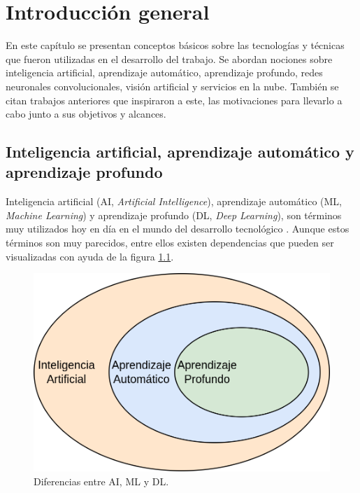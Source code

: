 
\chapter{Introducción general} %
\label{Chapter1} %
\label{IntroGeneral}


\newcommand{\keyword}[1]{\textbf{#1}}
\newcommand{\tabhead}[1]{\textbf{#1}}
\newcommand{\code}[1]{\texttt{#1}}
\newcommand{\file}[1]{\texttt{\bfseries#1}}
\newcommand{\option}[1]{\texttt{\itshape#1}}
\newcommand{\grados}{$^{\circ}$}

En este capítulo se presentan conceptos básicos sobre las tecnologías y técnicas que fueron utilizadas en el desarrollo del trabajo. Se abordan nociones sobre inteligencia artificial, aprendizaje automático, aprendizaje profundo, redes neuronales convolucionales, visión artificial y servicios en la nube. También se citan trabajos anteriores que inspiraron a este, las motivaciones para llevarlo a cabo junto a sus objetivos y alcances.

\section{Inteligencia artificial, aprendizaje automático y aprendizaje profundo}

Inteligencia artificial (AI, \textit{Artificial Intelligence}), aprendizaje automático (ML, \textit{Machine Learning}) y aprendizaje profundo (DL, \textit{Deep Learning}), son términos muy utilizados hoy en día en el mundo del desarrollo tecnológico \cite{ai_ml_dl}. Aunque estos términos son muy parecidos, entre ellos existen dependencias que pueden ser visualizadas con ayuda de la figura \ref{fig:ai_ml_dl}.

\begin{figure}[h]
	\centering
	\includegraphics[scale=0.25]{./Figures/ai_ml_dl.png}
	\caption{Diferencias entre AI, ML y DL.}
	\label{fig:ai_ml_dl}
\end{figure}


